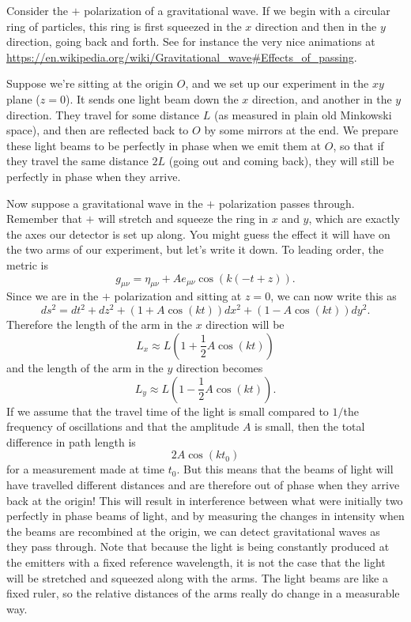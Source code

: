 Consider the $+$ polarization of a gravitational wave. If we begin with a circular ring of particles, this ring is first squeezed in the $x$ direction and then in the $y$ direction, going back and forth. See for instance the very nice animations at \url{https://en.wikipedia.org/wiki/Gravitational_wave#Effects_of_passing}.

Suppose we're sitting at the origin $O$, and we set up our experiment in the $xy$ plane ($z=0$). It sends one light beam down the $x$ direction, and another in the $y$ direction. They travel for some distance $L$ (as measured in plain old Minkowski space), and then are reflected back to $O$ by some mirrors at the end. We prepare these light beams to be perfectly in phase when we emit them at $O$, so that if they travel the same distance $2L$ (going out and coming back), they will still be perfectly in phase when they arrive.

Now suppose a gravitational wave in the $+$ polarization passes through. Remember that $+$ will stretch and squeeze the ring in $x$ and $y$, which are exactly the axes our detector is set up along. You might guess the effect it will have on the two arms of our experiment, but let's write it down. To leading order, the metric is
$$g_{\mu\nu}=\eta_{\mu\nu}+A e_{\mu\nu}\cos(k(-t+z)).$$
Since we are in the $+$ polarization and sitting at $z=0$, we can now write this as
$$ds^2=dt^2+dz^2+(1+A\cos(kt))dx^2
+(1-A\cos(k t))dy^2.$$
Therefore the length of the arm in the $x$ direction will be
$$L_x\approx L\left(1+\frac{1}{2}A\cos(kt)\right)$$
and the length of the arm in the $y$ direction becomes
$$L_y\approx L\left(1-\frac{1}{2}A\cos(k t)\right).$$
If we assume that the travel time of the light is small compared to $1/$the frequency of oscillations and that the amplitude $A$ is small, then the total difference in path length is
$$2A\cos(kt_0)$$
for a measurement made at time $t_0$. But this means that the beams of light will have travelled different distances and are therefore out of phase when they arrive back at the origin! This will result in interference between what were initially two perfectly in phase beams of light, and by measuring the changes in intensity when the beams are recombined at the origin, we can detect gravitational waves as they pass through. Note that because the light is being constantly produced at the emitters with a fixed reference wavelength, it is not the case that the light will be stretched and squeezed along with the arms. The light beams are like a fixed ruler, so the relative distances of the arms really do change in a measurable way.

